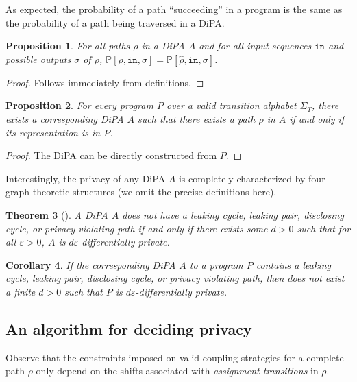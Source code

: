 \documentclass[12pt]{article}
\newcommand{\PP}{\mathbb{P}}
\newtheorem{thm}{Theorem}[section]
\newtheorem{prop}[thm]{Proposition}
\newtheorem{cor}[thm]{Corollary}
\theoremstyle{definition}
\begin{document}
As expected, the probability of a path ``succeeding'' in a program is the same as the probability of a path being traversed in a DiPA. 

\begin{prop}
    For all paths $\rho$ in a DiPA $A$ and for all input sequences $\texttt{in}$ and possible outputs $\sigma$ of $\rho$, $\PP[\rho, \texttt{in}, \sigma] = \PP[\hat{\rho}, \texttt{in}, \sigma]$.
\end{prop}
\begin{proof}
    Follows immediately from definitions. 
\end{proof}

\begin{prop}
    For every program $P$ over a valid transition alphabet $\Sigma_T$, there exists a corresponding DiPA $A$ such that there exists a path $\rho$ in $A$ if and only if its representation is in $P$. 
\end{prop}
\begin{proof}
    The DiPA can be directly constructed from $P$.
\end{proof}

Interestingly, the privacy of any DiPA $A$ is completely characterized by four graph-theoretic structures (we omit the precise definitions here). 

\begin{thm}[\cite{chadhaLinearTimeDecidability2021}]\label{DiPACounterexamplesThm}
    A DiPA $A$ does not have a leaking cycle, leaking pair, disclosing cycle, or privacy violating path if and only if there exists some $d>0$ such that for all $\varepsilon>0$, $A$ is $d\varepsilon$-differentially private. 
\end{thm}

\begin{cor}
    If the corresponding DiPA $A$ to a program $P$ contains a leaking cycle, leaking pair, disclosing cycle, or privacy violating path, then does not exist a finite $d>0$ such that $P$ is $d\varepsilon$-differentially private. 
\end{cor}


\subsection{An algorithm for deciding privacy}

Observe that the constraints imposed on valid coupling strategies for a complete path $\rho$ only depend on the shifts associated with \textit{assignment transitions} in $\rho$. 
\end{document}
